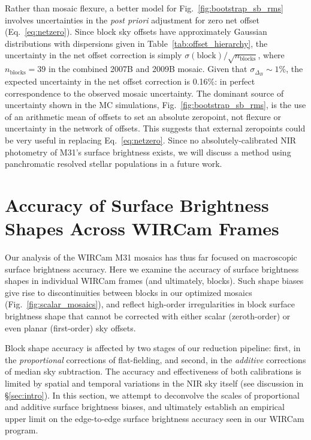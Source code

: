 \documentclass[iop]{emulateapj}
\newcommand{\Fig}[1]{Fig.~\ref{fig:#1}}  %
\newcommand{\Eq}[1]{Eq.~\ref{eq:#1}}  %
\newcommand{\Tab}[1]{Table~\ref{tab:#1}}  %
\newcommand{\Sec}[1]{\S\ref{sec:#1}}  %
\begin{document}
Rather than mosaic flexure, a better model for \Fig{bootstrap_sb_rms} involves uncertainties in the \textit{post priori} adjustment for zero net offset (\Eq{netzero}).
Since block sky offsets have approximately Gaussian distributions with dispersions given in \Tab{offset_hierarchy}, the uncertainty in the net offset correction is simply $\sigma(\mathrm{block})/\sqrt{n_\mathrm{blocks}}$, where $n_\mathrm{blocks}=39$ in the combined 2007B and 2009B mosaic.
Given that $\sigma_{\Delta_B}\sim 1\%$, the expected uncertainty in the net offset correction is 0.16\%: in perfect correspondence to the observed mosaic uncertainty.
The dominant source of uncertainty shown in the MC simulations, \Fig{bootstrap_sb_rms}, is the use of an arithmetic mean of offsets to set an absolute zeropoint, not flexure or uncertainty in the network of offsets.
This suggests that external zeropoints could be very useful in replacing \Eq{netzero}.
Since no absolutely-calibrated NIR photometry of M31's surface brightness exists, we will discuss a method using panchromatic resolved stellar populations in a future work.

\section{Accuracy of Surface Brightness Shapes Across WIRCam Frames}
\label{sec:skyflatstability}

Our analysis of the WIRCam M31 mosaics has thus far focused on macroscopic surface brightness accuracy.
Here we examine the accuracy of surface brightness shapes in individual WIRCam frames (and ultimately, blocks).
Such shape biases give rise to discontinuities between blocks in our optimized mosaics (\Fig{scalar_mosaics}), and reflect high-order irregularities in block surface brightness shape that cannot be corrected with either scalar (zeroth-order) or even planar (first-order) sky offsets.

Block shape accuracy is affected by two stages of our reduction pipeline: first, in the \emph{proportional} corrections of flat-fielding, and second, in the \emph{additive} corrections of median sky subtraction.
The accuracy and effectiveness of both calibrations is limited by spatial and temporal variations in the NIR sky itself (see discussion in \Sec{intro}).
In this section, we attempt to deconvolve the scales of proportional and additive surface brightness biases, and ultimately establish an empirical upper limit on the edge-to-edge surface brightness accuracy seen in our WIRCam program.
\end{document}
